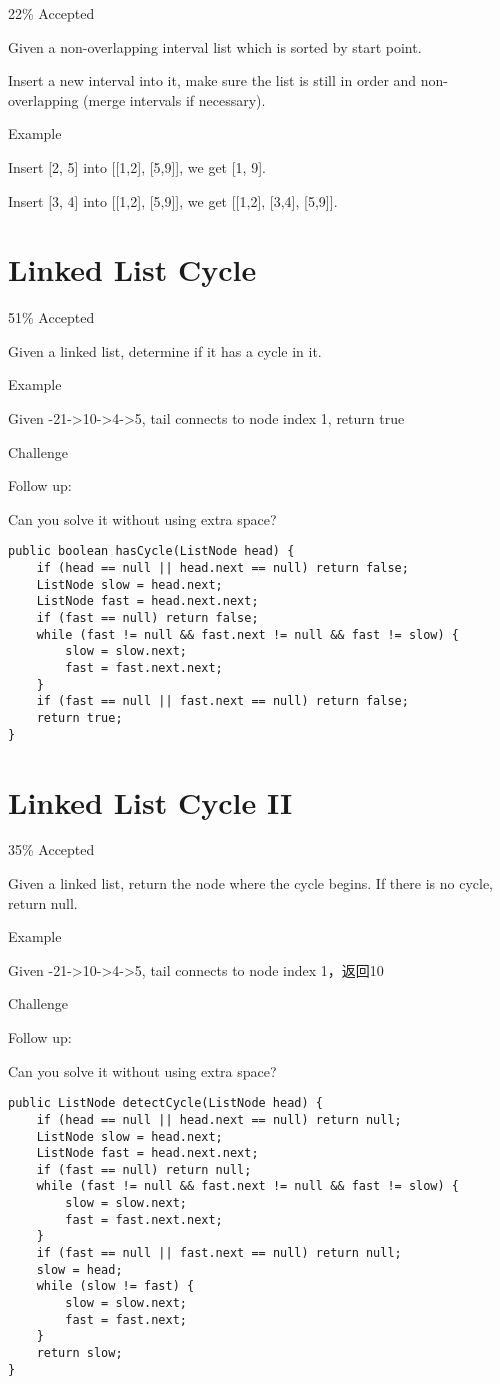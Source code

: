 \documentclass[12pt]{book}
\begin{document}
22\% Accepted

Given a non-overlapping interval list which is sorted by start point.

Insert a new interval into it, make sure the list is still in order and non-overlapping (merge intervals if necessary).

Example

Insert [2, 5] into [[1,2], [5,9]], we get [1, 9].

Insert [3, 4] into [[1,2], [5,9]], we get [[1,2], [3,4], [5,9]].
\chapter{Linked List Cycle}
\label{sec-33}

51\% Accepted

Given a linked list, determine if it has a cycle in it.



Example

Given -21->10->4->5, tail connects to node index 1, return true

Challenge

Follow up:

Can you solve it without using extra space?
\lstset{language=java,label= ,caption= ,numbers=none}
\begin{lstlisting}
public boolean hasCycle(ListNode head) {
    if (head == null || head.next == null) return false;
    ListNode slow = head.next;
    ListNode fast = head.next.next;
    if (fast == null) return false;
    while (fast != null && fast.next != null && fast != slow) {
        slow = slow.next;
        fast = fast.next.next;
    }
    if (fast == null || fast.next == null) return false;
    return true;
}
\end{lstlisting}
\chapter{Linked List Cycle II}
\label{sec-34}

35\% Accepted

Given a linked list, return the node where the cycle begins. If there is no cycle, return null.

Example

Given -21->10->4->5, tail connects to node index 1，返回10

Challenge

Follow up:

Can you solve it without using extra space? 
\lstset{language=java,label= ,caption= ,numbers=none}
\begin{lstlisting}
public ListNode detectCycle(ListNode head) {  
    if (head == null || head.next == null) return null;
    ListNode slow = head.next;
    ListNode fast = head.next.next;
    if (fast == null) return null;
    while (fast != null && fast.next != null && fast != slow) {
        slow = slow.next;
        fast = fast.next.next;
    }
    if (fast == null || fast.next == null) return null;
    slow = head;
    while (slow != fast) {
        slow = slow.next;
        fast = fast.next;
    }
    return slow;
}
\end{lstlisting}
\end{document}
